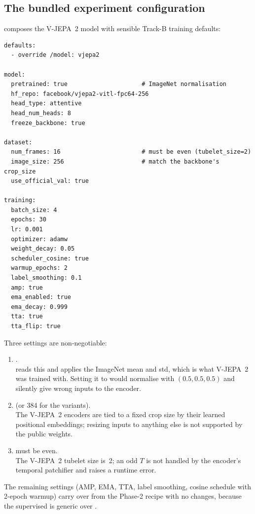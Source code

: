 \subsection{The bundled experiment configuration}

 composes the V-JEPA~2
model with sensible Track-B training defaults:

\begin{lstlisting}[style=yaml]
defaults:
  - override /model: vjepa2

model:
  pretrained: true                     # ImageNet normalisation
  hf_repo: facebook/vjepa2-vitl-fpc64-256
  head_type: attentive
  head_num_heads: 8
  freeze_backbone: true

dataset:
  num_frames: 16                       # must be even (tubelet_size=2)
  image_size: 256                      # match the backbone's crop_size
  use_official_val: true

training:
  batch_size: 4
  epochs: 30
  lr: 0.001
  optimizer: adamw
  weight_decay: 0.05
  scheduler_cosine: true
  warmup_epochs: 2
  label_smoothing: 0.1
  amp: true
  ema_enabled: true
  ema_decay: 0.999
  tta: true
  tta_flip: true
\end{lstlisting}

Three settings are non-negotiable:
\begin{enumerate}[leftmargin=2em]
\item {}.\\
       reads this and applies the ImageNet mean
      and std, which is what V-JEPA~2 was trained with. Setting it to
       would normalise with \((0.5, 0.5, 0.5)\) and silently
      give wrong inputs to the encoder.
\item {} (or 384 for the
       variants).\\
      The V-JEPA~2 encoders are tied to a fixed crop size by their
      learned positional embeddings; resizing inputs to anything else is
      not supported by the public weights.
\item {} must be even.\\
      The V-JEPA~2 tubelet size is~2; an odd \(T\) is not handled by the
      encoder's temporal patchifier and raises a runtime error.
\end{enumerate}

The remaining settings (AMP, EMA, TTA, label smoothing, cosine schedule
with 2-epoch warmup) carry over from the Phase-2 recipe with no
changes, because the supervised  is generic over
.


